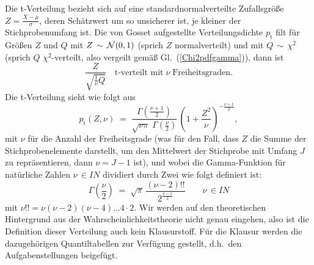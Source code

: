 Die t-Verteilung bezieht sich auf eine standardnormalverteilte Zufallsgröße $Z = \frac{X - \mu}{\sigma}$,
deren Schätzwert um so unsicherer ist, je kleiner der Stichprobenumfang ist. Die von Gosset aufgestellte
Verteilungsdichte $p_\mathrm{t}$ filt für Größen $Z$ und $Q$ mit $Z \, \sim \, {\cal N}(0,1)$
(sprich $Z$ normalverteilt) und mit $Q \, \sim \, \chi^2$ (sprich $Q$ $\chi^2$-verteilt, also
vergeilt gemäß Gl.~(\ref{Chi2pdfgamma})), dann ist
\begin{equation}
\frac{Z}{\sqrt{\frac{1}{\nu} Q}} \quad \text{t-verteilt mit} \; \nu \; \text{Freiheitsgraden.}
\end{equation}
Die t-Verteilung sieht wie folgt aus
\begin{equation}
p_\mathrm{t}(Z,\nu) \; = \;
{\frac {\Gamma \left({\frac {\nu+1}{2}}\right)}{{\sqrt {\nu \pi }} \;
\Gamma \left({\frac {\nu}{2}}\right)}} \, \left(1+{\frac {Z^2}{\nu}}\right)^{-{\frac {\nu+1}{2}}} ,
\end{equation}
mit $\nu$ für die Anzahl der Freiheitsgrade (was für den Fall, dass $Z$
die Summe der Stichprobenelemente darstellt, um den Mittelwert der Stichprobe mit Umfang $J$
zu repräsentieren, dann $\nu = J-1$ ist), und wobei
die Gamma-Funktion für natürliche Zahlen $\nu \, \in I \!\! N$ dividiert durch Zwei
wie folgt definiert ist:
\begin{equation}
\Gamma \left({\frac{\nu}{2}}\right) \; = \;
\sqrt{\pi} \, \frac{(\nu-2)!!}{ 2^{\frac{\nu-1}{2}} } \qquad \nu \, \in I \!\! N
\label{GammaHalfInt}
\end{equation}
mit $\nu!! = \nu (\nu-2) (\nu-4) \dots 4 \cdot 2$.
Wir werden auf den theoretischen Hintergrund aus der Wahrscheinlichkeitstheorie nicht
genau eingehen, also ist die Definition dieser Verteilung auch kein Klausurstoff.
Für die Klausur werden die dazugehörigen Quantiltabellen zur Verfügung gestellt, d.h.\
den Aufgabenstellungen beigefügt.

